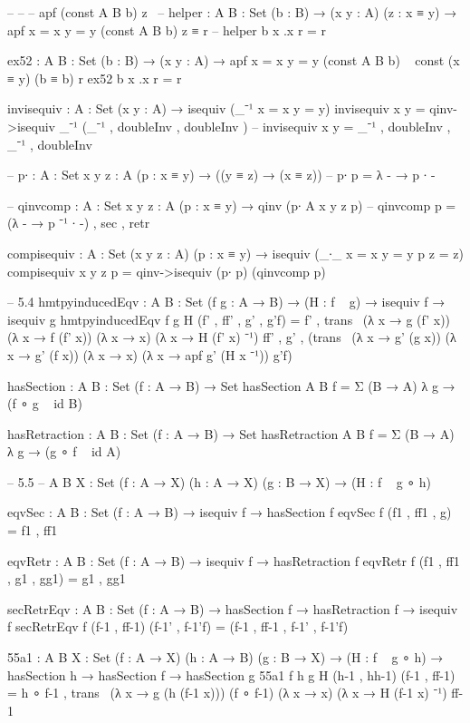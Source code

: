 \documentclass[11pt, a4paper]{article}
\begin{document}
\begin{code}
  -- -- -- apf (const A B b) z \
  -- helper :  {A B : Set} (b : B) → (x y : A) (z : x ≡ y) → apf {x = x} {y = y} (const A B b) z ≡ r
  -- helper b x .x r = r

  ex52 :  {A B : Set} (b : B) → (x y : A) → apf {x = x} {y = y} (const A B b) ~ const (x ≡ y) (b ≡ b) r
  ex52 b x .x r = r

  invisequiv : {A : Set} (x y : A) → isequiv (_⁻¹ {x = x} {y = y})
  invisequiv x y = qinv->isequiv _⁻¹ (_⁻¹ , doubleInv ,  doubleInv )
  -- invisequiv x y = _⁻¹ , doubleInv , _⁻¹ , doubleInv 

  -- p∙ : {A : Set} {x y z : A} (p : x ≡ y) → ((y ≡ z) → (x ≡ z)) 
  -- p∙ p = λ - → p ∙ -

  -- qinvcomp : {A : Set} {x y z : A} (p : x ≡ y) → qinv (p∙ {A} {x} {y} {z} p)
  -- qinvcomp p = (λ - → p ⁻¹ ∙ -) , sec , retr

  compisequiv : {A : Set} (x y z : A) (p : x ≡ y) → isequiv (_∙_ {x = x} {y = y} p {z = z})
  compisequiv x y z p = qinv->isequiv (p∙ p) (qinvcomp p)

  -- 5.4
  hmtpyinducedEqv : {A B : Set} (f g : A → B) → (H : f ~ g) → isequiv f → isequiv g
  hmtpyinducedEqv f g H (f' , ff' , g' , g'f) = f' , trans~ (λ x → g (f' x)) (λ x → f (f' x)) (λ x → x) (λ x → H (f' x) ⁻¹) ff'
                                              , g' , (trans~ (λ x → g' (g x)) (λ x → g' (f x)) (λ x → x) (λ x → apf g' (H x ⁻¹)) g'f)

  hasSection : {A B : Set} (f : A → B) → Set
  hasSection {A} {B} f = Σ (B → A) λ g → (f ∘ g ~ id {B})

  hasRetraction : {A B : Set} (f : A → B) → Set
  hasRetraction {A} {B} f = Σ (B → A) λ g → (g ∘ f ~ id {A})

  -- 5.5
  -- {A B X : Set} (f : A → X) (h : A → X) (g : B → X) → (H : f ~ g ∘ h)

  eqvSec : {A B : Set} (f : A → B) → isequiv f → hasSection f
  eqvSec f (f1 , ff1 , g) = f1 , ff1

  eqvRetr : {A B : Set} (f : A → B) → isequiv f → hasRetraction f
  eqvRetr f (f1 , ff1 , g1 , gg1) = g1 , gg1

  secRetrEqv : {A B : Set} (f : A → B) → hasSection f → hasRetraction f → isequiv f
  secRetrEqv f (f-1 , ff-1) (f-1' , f-1'f) = (f-1 , ff-1 , f-1' , f-1'f)

  55a1 : {A B X : Set} (f : A → X) (h : A → B) (g : B → X) → (H : f ~ g ∘ h) → hasSection h → hasSection f → hasSection g
  55a1 f h g H (h-1 , hh-1) (f-1 , ff-1) = h ∘ f-1 , trans~ (λ x → g (h (f-1 x))) (f ∘ f-1) (λ x → x) (λ x → H (f-1 x) ⁻¹) ff-1


\end{code}
\end{document}
